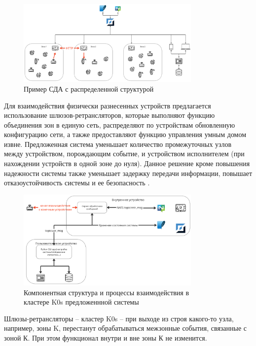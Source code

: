 \documentclass[a4paper,12pt]{article}
\begin{document}
\begin{figure}[h]
    \centering
    \includegraphics[width=0.8\textwidth]{images/GlobalSystemDesing.png}
    \caption{Пример СДА с распределенной структурой}
    \label{fig:GlobalSystemDesing}
\end{figure}

Для взаимодействия физически разнесенных устройств предлагается использование
шлюзов-ретрансляторов, которые выполняют функцию объединения зон в единую сеть,
распределяют по устройствам обновленную конфигурацию сети, а также предоставляют функцию управления умным домом извне.
Предложенная система уменьшает количество промежуточных узлов между устройством, порождающим событие, и устройством
исполнителем (при нахождении устройств в одной зоне до нуля). Данное решение кроме повышения надежности системы также
уменьшает задержку передачи информации, повышает отказоустойчивость системы и ее безопасность \cite{SecuritySmartHome, SecuritySmartHome2}.

\begin{figure}[H]
    \centering
    \includegraphics[width=0.8\textwidth]{images/InternalSystemDesign.png}
    \captionsetup{justification=centering}
    \caption{Компонентная структура и процессы взаимодействия в\\кластере K0s предложеннной системы}
    \label{fig:InternalSystemDesign}
\end{figure}


Шлюзы-ретрансляторы -- кластер K0s -- при выходе из строя какого-то узла, например, зоны
K, перестанут обрабатываться межзонные события, связанные с зоной К. При этом функционал внутри и вне зоны
К не изменится.
\end{document}
